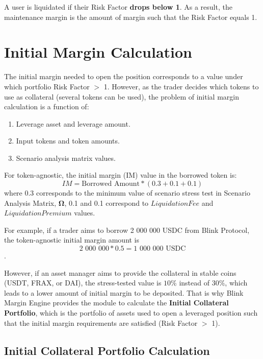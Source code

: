 \documentclass[conference]{IEEEtran}
\begin{document}
A user is liquidated if their Risk Factor \textbf{drops below 1}. As a result, the maintenance margin is the amount of margin such that the Risk Factor equals 1.

 \section{Initial Margin Calculation}
 
The initial margin needed to open the position corresponds to a value under which portfolio Risk Factor $>$ 1. However, as the trader decides which tokens to use as collateral (several tokens can be used), the problem of initial margin calculation is a function of: 
\begin{enumerate}
	\item Leverage asset and leverage amount. 
	\item Input tokens and token amounts. 
	\item Scenario analysis matrix values. 
\end{enumerate} 

For token-agnostic, the initial margin (IM) value in the borrowed token is: $$IM = \text{Borrowed Amount} *(0.3+0.1+0.1)$$ where 0.3 corresponds to the minimum value of scenario stress test in Scenario Analysis Matrix, $\boldsymbol{\Omega}$, 0.1 and 0.1 correspond to $Liquidation Fee$  and $Liquidation Premium$ values.

For example, if a trader aims to borrow 2 000 000 USDC from Blink Protocol, the token-agnostic initial margin amount is $$\text{2 000 000} * 0.5 = \text{1 000 000 USDC}$$.

However, if an asset manager aims to provide the collateral in stable coins (USDT, FRAX, or DAI), the stress-tested value is $10\%$ instead of $30\%$, which leads to a lower amount of initial margin to be deposited. That is why Blink Margin Engine provides the module to calculate the \textbf{Initial Collateral Portfolio}, which is the portfolio of assets used to open a leveraged position such that the initial margin requirements are satisfied (Risk Factor $>$ 1).

\subsection{Initial Collateral Portfolio Calculation}
\end{document}
